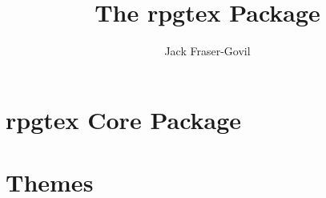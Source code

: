 \documentclass[11pt,theme=default]{rpgbook}
\title{The rpgtex Package}
\author{Jack Fraser-Govil}
\begin{document}
	\frontmatter
	\maketitle{}

	\tableofcontents
	\mainmatter{}


	\part{rpgtex Core Package}

		

		
		
		
	\part{Themes}
		
		
		
\end{document}
